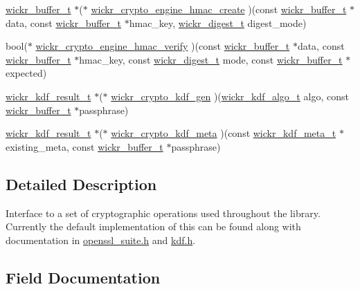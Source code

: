\begin{DoxyCompactItemize}
\item 
\hyperlink{structwickr__buffer}{wickr\+\_\+buffer\+\_\+t} $\ast$($\ast$ \hyperlink{group__wickr__crypto__engine_ga782e0e8786ecf8a55c8ae2aea2f178aa}{wickr\+\_\+crypto\+\_\+engine\+\_\+hmac\+\_\+create} )(const \hyperlink{structwickr__buffer}{wickr\+\_\+buffer\+\_\+t} $\ast$data, const \hyperlink{structwickr__buffer}{wickr\+\_\+buffer\+\_\+t} $\ast$hmac\+\_\+key, \hyperlink{structwickr__digest}{wickr\+\_\+digest\+\_\+t} digest\+\_\+mode)
\item 
bool($\ast$ \hyperlink{group__wickr__crypto__engine_ga00c52a816403192af5b21d952265d0b6}{wickr\+\_\+crypto\+\_\+engine\+\_\+hmac\+\_\+verify} )(const \hyperlink{structwickr__buffer}{wickr\+\_\+buffer\+\_\+t} $\ast$data, const \hyperlink{structwickr__buffer}{wickr\+\_\+buffer\+\_\+t} $\ast$hmac\+\_\+key, const \hyperlink{structwickr__digest}{wickr\+\_\+digest\+\_\+t} mode, const \hyperlink{structwickr__buffer}{wickr\+\_\+buffer\+\_\+t} $\ast$expected)
\item 
\hyperlink{structwickr__kdf__result}{wickr\+\_\+kdf\+\_\+result\+\_\+t} $\ast$($\ast$ \hyperlink{group__wickr__crypto__engine_ga5ab29968c993423df83c9f1a3d7e685d}{wickr\+\_\+crypto\+\_\+kdf\+\_\+gen} )(\hyperlink{structwickr__kdf__algo}{wickr\+\_\+kdf\+\_\+algo\+\_\+t} algo, const \hyperlink{structwickr__buffer}{wickr\+\_\+buffer\+\_\+t} $\ast$passphrase)
\item 
\hyperlink{structwickr__kdf__result}{wickr\+\_\+kdf\+\_\+result\+\_\+t} $\ast$($\ast$ \hyperlink{group__wickr__crypto__engine_ga640cbc86ca36c4deb2c197de89dce7d1}{wickr\+\_\+crypto\+\_\+kdf\+\_\+meta} )(const \hyperlink{structwickr__kdf__meta}{wickr\+\_\+kdf\+\_\+meta\+\_\+t} $\ast$existing\+\_\+meta, const \hyperlink{structwickr__buffer}{wickr\+\_\+buffer\+\_\+t} $\ast$passphrase)
\end{DoxyCompactItemize}


\subsection{Detailed Description}
Interface to a set of cryptographic operations used throughout the library. Currently the default implementation of this can be found along with documentation in \hyperlink{openssl__suite_8h_source}{openssl\+\_\+suite.\+h} and \hyperlink{kdf_8h_source}{kdf.\+h}. 

\subsection{Field Documentation}
\mbox{\label{structwickr__crypto__engine_a307f7d46b55b1e0a93ce9d9489ba8fc5}} 
